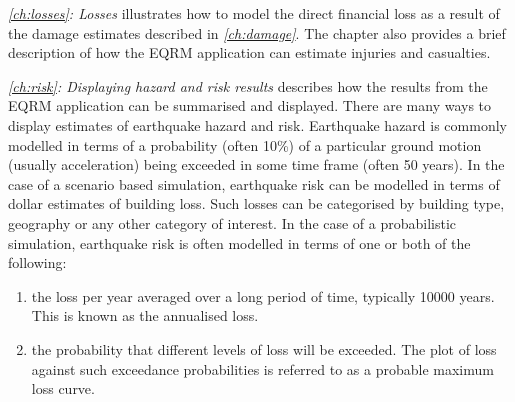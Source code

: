 \textit{\cref{ch:losses}: Losses} illustrates how to model the
direct financial loss as a result of the damage estimates
described in \textit{\cref{ch:damage}}. The chapter also provides
a brief description of how the EQRM application can estimate
injuries and casualties.

\textit{\cref{ch:risk}: Displaying hazard and risk results}
describes how the results from the EQRM application can be
summarised and displayed. There are many ways to display estimates
of earthquake hazard and risk. Earthquake hazard is commonly
modelled in terms of a probability (often 10\%) of a particular
ground motion (usually acceleration) being exceeded in some time
frame (often 50 years). In the case of a scenario based
simulation, earthquake risk can be modelled in terms of dollar
estimates of building loss. Such losses can be categorised by
building type, geography or any other
category of interest. In the case of a probabilistic simulation,
earthquake risk is often modelled in terms of one or both of the
following:
\begin{enumerate}
\item the loss per year averaged over a long period of time,
typically 10000 years. This is known as the annualised loss. \item
the probability that different levels of loss will be exceeded.
The plot of loss against such exceedance probabilities is referred
to as a probable maximum loss curve.
\end{enumerate}

